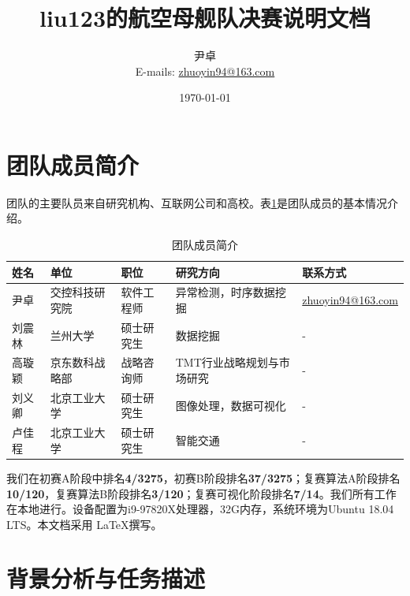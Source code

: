\documentclass[UTF8, 12pt]{ctexart}
\begin{document}
	\title{\heiti \Huge{liu123的航空母舰队决赛说明文档}}
	\author{\kaishu 尹卓 \\ E-mails: \href{mailto:zhuoyin94@163.com}{zhuoyin94@163.com}}
	\date{\today}
	\maketitle

	\tableofcontents
	\newpage
	\section{团队成员简介}
		团队的主要队员来自研究机构、互联网公司和高校。表\ref{table_0}是团队成员的基本情况介绍。

		\begin{table}[H]
		\centering
		\small
		\caption{团队成员简介}
		\label{table_0}
		\renewcommand\arraystretch{0.9}
		\begin{tabular}{lllp{2.4cm}l}
			\toprule
			\textbf{姓名} & \textbf{单位} & \textbf{职位} & \textbf{研究方向} & \textbf{联系方式}\\
			\midrule
			尹卓\footnotemark[1] & 交控科技研究院 & 软件工程师 & 异常检测，时序数据挖掘 & \href{mailto:zhuoyin94@163.com}{zhuoyin94@163.com}\\
			刘震林 & 兰州大学 & 硕士研究生 & 数据挖掘 & - \\
			高璇颖 & 京东数科战略部 & 战略咨询师 & TMT行业战略规划与市场研究 & - \\
			刘义卿 & 北京工业大学 & 硕士研究生 & 图像处理，数据可视化 & - \\
			卢佳程 & 北京工业大学 & 硕士研究生 & 智能交通 & - \\
			\bottomrule
		\end{tabular}
		\end{table}

		我们在初赛A阶段中排名\textbf{4/3275}，初赛B阶段排名\textbf{37/3275}；复赛算法A阶段排名\textbf{10/120}，复赛算法B阶段排名\textbf{3/120}；复赛可视化阶段排名\textbf{7/14}。我们所有工作在本地进行。设备配置为i9-97820X处理器，32G内存，系统环境为Ubuntu 18.04 LTS。本文档采用 \LaTeX 撰写。

	\section{背景分析与任务描述}
\end{document}

